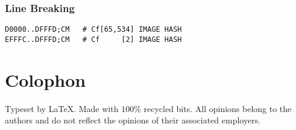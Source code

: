 \documentclass[12pt]{article}
\begin{document}
\subsubsection{Line Breaking}

\begin{verbatim}
D0000..DFFFD;CM   # Cf[65,534] IMAGE HASH                                                                                                                                         
EFFFC..DFFFD;CM   # Cf     [2] IMAGE HASH                                                                                                                                         
\end{verbatim}




{}
\printbibliography
\section*{Colophon}

Typeset by \LaTeX . Made with \( 100\%  \) recycled bits.
All opinions belong to the authors and do not reflect the opinions
of their associated employers.
\end{document}
